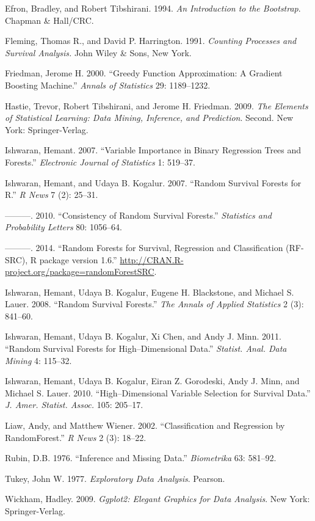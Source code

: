 \documentclass[article, nojss]{jss}
\begin{document}
\hypertarget{ref-bootstrap:1994}{}
Efron, Bradley, and Robert Tibshirani. 1994. \emph{An Introduction to
the Bootstrap}. Chapman \& Hall/CRC.

\hypertarget{ref-fleming:1991}{}
Fleming, Thomas R., and David P. Harrington. 1991. \emph{Counting
Processes and Survival Analysis.} John Wiley \& Sons, New York.

\hypertarget{ref-Friedman:2000}{}
Friedman, Jerome H. 2000. ``Greedy Function Approximation: A Gradient
Boosting Machine.'' \emph{Annals of Statistics} 29: 1189--1232.

\hypertarget{ref-StatisticalLearning:2009}{}
Hastie, Trevor, Robert Tibshirani, and Jerome H. Friedman. 2009.
\emph{The Elements of Statistical Learning: Data Mining, Inference, and
Prediction}. Second. New York: Springer-Verlag.

\hypertarget{ref-Ishwaran:2007}{}
Ishwaran, Hemant. 2007. ``Variable Importance in Binary Regression Trees
and Forests.'' \emph{Electronic Journal of Statistics} 1: 519--37.

\hypertarget{ref-Ishwaran:2007a}{}
Ishwaran, Hemant, and Udaya B. Kogalur. 2007. ``Random Survival Forests
for R.'' \emph{R News} 7 (2): 25--31.

\hypertarget{ref-Ishwaran:2010a}{}
---------. 2010. ``Consistency of Random Survival Forests.''
\emph{Statistics and Probability Letters} 80: 1056--64.

\hypertarget{ref-Ishwaran:RFSRC:2014}{}
---------. 2014. ``Random Forests for Survival, Regression and
Classification (RF-SRC), R package version 1.6.''
\url{http://CRAN.R-project.org/package=randomForestSRC}.

\hypertarget{ref-Ishwaran:2008}{}
Ishwaran, Hemant, Udaya B. Kogalur, Eugene H. Blackstone, and Michael S.
Lauer. 2008. ``Random Survival Forests.'' \emph{The Annals of Applied
Statistics} 2 (3): 841--60.

\hypertarget{ref-Ishwaran:2011}{}
Ishwaran, Hemant, Udaya B. Kogalur, Xi Chen, and Andy J. Minn. 2011.
``Random Survival Forests for High--Dimensional Data.'' \emph{Statist.
Anal. Data Mining} 4: 115--32.

\hypertarget{ref-Ishwaran:2010}{}
Ishwaran, Hemant, Udaya B. Kogalur, Eiran Z. Gorodeski, Andy J. Minn,
and Michael S. Lauer. 2010. ``High--Dimensional Variable Selection for
Survival Data.'' \emph{J. Amer. Statist. Assoc.} 105: 205--17.

\hypertarget{ref-Liaw:2002}{}
Liaw, Andy, and Matthew Wiener. 2002. ``Classification and Regression by
RandomForest.'' \emph{R News} 2 (3): 18--22.

\hypertarget{ref-Rubin:1976}{}
Rubin, D.B. 1976. ``Inference and Missing Data.'' \emph{Biometrika} 63:
581--92.

\hypertarget{ref-Tukey:1977}{}
Tukey, John W. 1977. \emph{Exploratory Data Analysis}. Pearson.

\hypertarget{ref-Wickham:2009}{}
Wickham, Hadley. 2009. \emph{Ggplot2: Elegant Graphics for Data
Analysis}. New York: Springer-Verlag.
\end{document}

